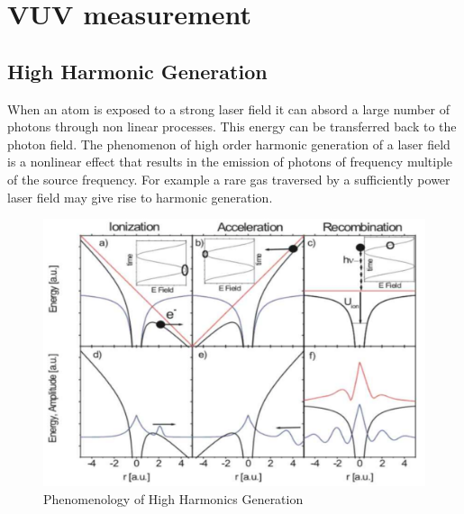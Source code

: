 
\chapter{VUV measurement}

\section{High Harmonic Generation}
When an atom is exposed to a strong laser field it can absord a large number of photons through non linear processes. This energy can be transferred back to the photon field.
The phenomenon of high order harmonic generation of a laser field is a nonlinear effect that results in the emission of photons of frequency multiple of the source frequency. For example a rare gas traversed by a sufficiently power laser field may give rise to harmonic generation.
\begin{figure}[htbp]
\begin{center}
\includegraphics[width=12cm]{../Pictures/Chapter_8/HHG}
\end{center}
\caption[HHG phenomenology]{Phenomenology of High Harmonics Generation}
\label{fig:HHG}
\end{figure}

